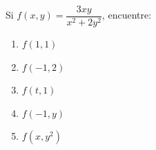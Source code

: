 \item Si $f(x, y) = \dfrac{3xy}{x^2 + 2y^2}$, encuentre:
\begin{enumerate}[label=(\alph*)]
    \item $f(1, 1)$
    \item $f(-1, 2)$
    \item $f(t, 1)$
    \item $f(-1, y)$
    \item $f(x, y^2)$
\end{enumerate}

